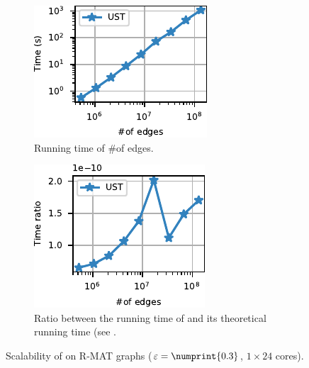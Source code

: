 \begin{figure}[tb]
\centering
\begin{subfigure}[t]{.45\textwidth}
\centering
\includegraphics[width=.7\textwidth]{sources/plots/el-clos/rmat-scalability.pdf}
\caption{Running time of \ust \wrt \#of edges.}
\label{fig:el-clos:rmat-running-time}
\end{subfigure}\hfill
\begin{subfigure}[t]{.45\textwidth}
\centering
\includegraphics[width=.7\textwidth]{sources/plots/el-clos/rmat-theoretical-scalability.pdf}
\caption{Ratio between the running time of \ust and its theoretical running
time (see .}
\label{fig:el-clos:rmat-theo-running-time}
\end{subfigure}
\caption{Scalability of \ust on R-MAT graphs ($\epsilon = \numprint{0.3}$,
$1\times 24$ cores).}
\label{fig:el-clos:rmat-scalability}
\end{figure}

